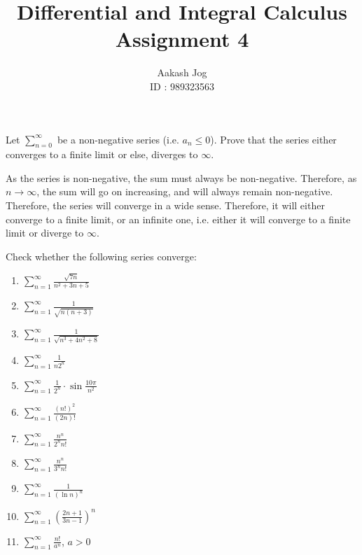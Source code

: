 \documentclass[fleqn, a4paper, 12pt, oneside]{amsart}
\title
{
	Differential and Integral Calculus\\
	Assignment 4
}
\author
{
	Aakash Jog\\
	ID : 989323563
}
\date{\formatdate{30}{4}{2015}}
\theoremstyle{definition}
\theoremstyle{theorem}
\begin{document}
	
\maketitle

\begin{question}
	Let $\sum\limits_{n = 0}^{\infty}$ be a non-negative series (i.e. $a_n \le 0$).
	Prove that the series either converges to a finite limit or else, diverges to $\infty$.
\end{question}

\begin{solution}
	As the series is non-negative, the sum must always be non-negative.
	Therefore, as $n \to \infty$, the sum will go on increasing, and will always remain non-negative.
	Therefore, the series will converge in a wide sense.
	Therefore, it will either converge to a finite limit, or an infinite one, i.e. either it will converge to a finite limit or diverge to $\infty$.
\end{solution}

\begin{question}
	Check whether the following series converge:
	\begin{enumerate}[label=(\alph*)]
		\item $\sum\limits_{n = 1}^{\infty} \frac{\sqrt{7 n}}{n^2 + 3 n + 5}$
		\item $\sum\limits_{n = 1}^{\infty} \frac{1}{\sqrt{n (n + 3)}}$
		\item $\sum\limits_{n = 1}^{\infty} \frac{1}{\sqrt{n^3 + 4 n^2 + 8}}$
		\item $\sum\limits_{n = 1}^{\infty} \frac{1}{n 2^n}$
		\item $\sum\limits_{n = 1}^{\infty} \frac{1}{2^n} \cdot \sin \frac{10 \pi}{n^2}$
		\item $\sum\limits_{n = 1}^{\infty} \frac{(n!)^2}{(2n)!}$
		\item $\sum\limits_{n = 1}^{\infty} \frac{n^n}{2^n n!}$
		\item $\sum\limits_{n = 1}^{\infty} \frac{n^n}{3^n n!}$
		\item $\sum\limits_{n = 1}^{\infty} \frac{1}{(\ln n)^n}$
		\item $\sum\limits_{n = 1}^{\infty} \left( \frac{2 n + 1}{3 n - 1} \right)^n$
		\item $\sum\limits_{n = 1}^{\infty} \frac{n!}{a^n}$, $a > 0$
	\end{enumerate}
\end{question}
\end{document}
